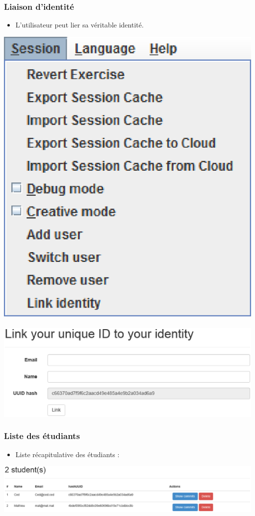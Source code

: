 \begin{frame}
	\frametitle{Liaison d'identité}
	\begin{itemize}
	\item L'utilisateur peut lier sa véritable identité.
	\end{itemize}
	\begin{center}
		\includegraphics[scale=0.33]{images/menu.eps} $ \qquad$
		\includegraphics[scale=0.28]{images/link.eps}
	\end{center}
\end{frame}
\begin{frame}
	\frametitle{Liste des étudiants}
	\begin{itemize}
	\item Liste récapitulative des étudiants :
	\end{itemize}
	\begin{center}
		\includegraphics[scale=0.3]{images/students.eps}
	\end{center}
\end{frame}
